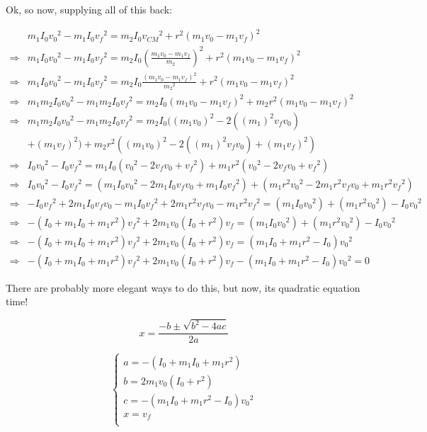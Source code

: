 \documentclass[letterpaper]{article}
\begin{document}
Ok, so now, supplying all of this back:

\begin{align}
& m_1I_0{v_0}^2 -m_1I_0{v_f}^2 =  m_2I_0{v_{CM}}^2+r^2(m_1 v_0 - m_1v_f)^2\\
\Rightarrow & m_1I_0{v_0}^2 -m_1I_0{v_f}^2 =  m_2I_0{\left(\frac{m_1 v_0 -m_1v_f}{m_2}\right)}^2+r^2(m_1 v_0 - m_1v_f)^2\\
\Rightarrow & m_1I_0{v_0}^2 -m_1I_0{v_f}^2 =  m_2I_0{\frac{(m_1 v_0 -m_1v_f)^2}{{m_2}^2}}+r^2(m_1 v_0 - m_1v_f)^2\\
\Rightarrow & m_1m_2I_0{v_0}^2 -m_1m_2I_0{v_f}^2 =  m_2I_0(m_1 v_0 -m_1v_f)^2+m_2r^2(m_1 v_0 - m_1v_f)^2\\
\Rightarrow & m_1m_2I_0{v_0}^2 -m_1m_2I_0{v_f}^2 =  m_2I_0((m_1 v_0)^2 -2((m_1)^2v_fv_0) \\&+ (m_1 v_f)^2)+m_2r^2((m_1 v_0)^2 -2((m_1)^2v_fv_0) + (m_1 v_f)^2)\\
\Rightarrow & I_0{v_0}^2 -I_0{v_f}^2 =  m_1I_0({v_0}^2 -2v_fv_0 + {v_f}^2)+m_1r^2({v_0}^2 -2v_fv_0 + {v_f}^2)\\
\Rightarrow & I_0{v_0}^2 -I_0{v_f}^2 =  (m_1I_0{v_0}^2 -2m_1I_0v_fv_0 + m_1I_0{v_f}^2)+(m_1r^2{v_0}^2 -2m_1r^2v_fv_0 +m_1r^2 {v_f}^2)\\
\Rightarrow & -I_0{v_f}^2 +2m_1I_0v_fv_0 - m_1I_0{v_f}^2+2m_1r^2v_fv_0 -m_1r^2 {v_f}^2=  (m_1I_0{v_0}^2)+(m_1r^2{v_0}^2 )- I_0{v_0}^2 \\
\Rightarrow & -(I_0+m_1I_0+m_1r^2){v_f}^2 +2m_1v_0(I_0+r^2)v_f =  (m_1I_0{v_0}^2)+(m_1r^2{v_0}^2 )- I_0{v_0}^2 \\
\Rightarrow & -(I_0+m_1I_0+m_1r^2){v_f}^2 +2m_1v_0(I_0+r^2)v_f =  (m_1I_0+m_1r^2-I_0){v_0}^2 \\
\Rightarrow & -(I_0+m_1I_0+m_1r^2){v_f}^2 +2m_1v_0(I_0+r^2)v_f-(m_1I_0+m_1r^2-I_0){v_0}^2 = 0  
\end{align}

There are probably more elegant ways to do this, but now, its quadratic equation time!

\begin{equation}
   x = \frac{-b\pm\sqrt{b^2-4ac}}{2a} 
\end{equation}

\begin{equation}
   \begin{cases}
   a = -(I_0+m_1I_0+m_1r^2)\\ 
   b = 2m_1v_0(I_0+r^2)\\ 
   c = -(m_1I_0+m_1r^2-I_0){v_0}^2\\ 
   x = v_f\\ 
\end{cases}
\end{equation}
\end{document}
